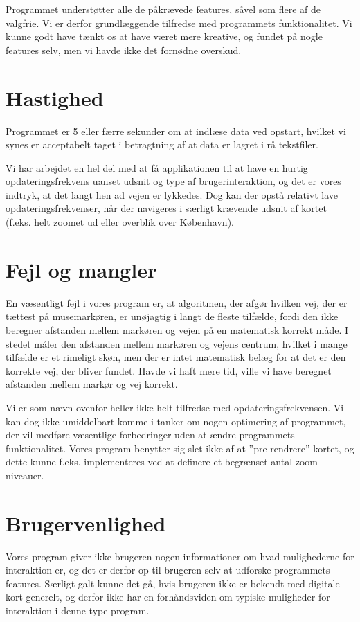Programmet understøtter alle de påkrævede features, såvel som flere af de valgfrie. Vi er derfor grundlæggende tilfredse med programmets funktionalitet. Vi kunne godt have tænkt os at have været mere kreative, og fundet på nogle features selv, men vi havde ikke det fornødne overskud.

\section{Hastighed}

Programmet er \~5 eller færre sekunder om at indlæse data ved opstart, hvilket vi synes er acceptabelt taget i betragtning af at data er lagret i rå tekstfiler.

Vi har arbejdet en hel del med at få applikationen til at have en hurtig opdateringsfrekvens uanset udsnit og type af brugerinteraktion, og det er vores indtryk, at det langt hen ad vejen er lykkedes. Dog kan der opstå relativt lave opdateringsfrekvenser, når der navigeres i særligt krævende udsnit af kortet (f.eks. helt zoomet ud eller overblik over København).

\section{Fejl og mangler}

En væsentligt fejl i vores program er, at algoritmen, der afgør hvilken vej, der er tættest på musemarkøren, er unøjagtig i langt de fleste tilfælde, fordi den ikke beregner afstanden mellem markøren og vejen på en matematisk korrekt måde. I stedet måler den afstanden mellem markøren og vejens centrum, hvilket i mange tilfælde er et rimeligt skøn, men der er intet matematisk belæg for at det er den korrekte vej, der bliver fundet. Havde vi haft mere tid, ville vi have beregnet afstanden mellem markør og vej korrekt.

Vi er som nævn ovenfor heller ikke helt tilfredse med opdateringsfrekvensen. Vi kan dog ikke umiddelbart komme i tanker om nogen optimering af programmet, der vil medføre væsentlige forbedringer uden at ændre programmets funktionalitet. Vores program benytter sig slet ikke af at ''pre-rendrere'' kortet, og dette kunne f.eks. implementeres ved at definere et begrænset antal zoom-niveauer.

\section{Brugervenlighed}

Vores program giver ikke brugeren nogen informationer om hvad mulighederne for interaktion er, og det er derfor op til brugeren selv at udforske programmets features. Særligt galt kunne det gå, hvis brugeren ikke er bekendt med digitale kort generelt, og derfor ikke har en forhåndsviden om typiske muligheder for interaktion i denne type program.